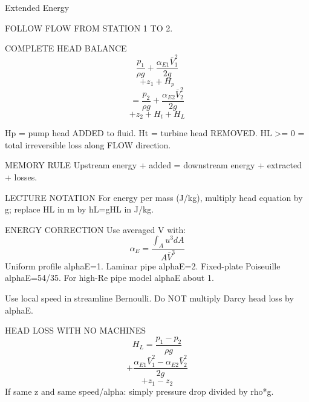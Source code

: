 Extended Energy

FOLLOW FLOW FROM STATION 1 TO 2.

COMPLETE HEAD BALANCE
$$\frac{p_1}{\rho g}+\frac{\alpha_{E1}\bar V_1^2}{2g}$$
$$+z_1+H_p$$
$$=\frac{p_2}{\rho g}+\frac{\alpha_{E2}\bar V_2^2}{2g}$$
$$+z_2+H_t+H_L$$

Hp = pump head ADDED to fluid.
Ht = turbine head REMOVED.
HL >= 0 = total irreversible loss along FLOW direction.

MEMORY RULE
Upstream energy + added = downstream energy + extracted + losses.

LECTURE NOTATION
For energy per mass (J/kg), multiply head equation by g; replace HL in m by hL=gHL in J/kg.

ENERGY CORRECTION
Use averaged V with:
$$\alpha_E=\frac{\int_Au^3dA}{A\bar V^3}$$
Uniform profile alphaE=1.
Laminar pipe alphaE=2.
Fixed-plate Poiseuille alphaE=54/35.
For high-Re pipe model alphaE about 1.

Use local speed in streamline Bernoulli. Do NOT multiply Darcy head loss by alphaE.

HEAD LOSS WITH NO MACHINES
$$H_L=\frac{p_1-p_2}{\rho g}$$
$$+\frac{\alpha_{E1}\bar V_1^2-\alpha_{E2}\bar V_2^2}{2g}$$
$$+z_1-z_2$$
If same z and same speed/alpha: simply pressure drop divided by rho*g.
